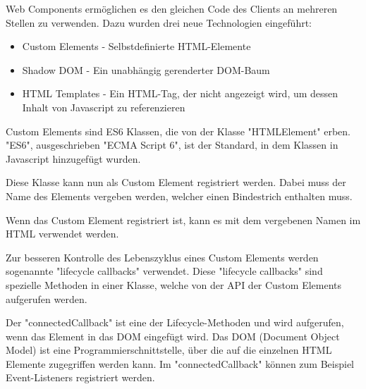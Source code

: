 
Web Components ermöglichen es den gleichen Code des Clients an mehreren Stellen zu verwenden. Dazu wurden drei neue Technologien \cite{MDNWebComponents} eingeführt:

\begin{itemize}
    \item Custom Elements - Selbstdefinierte HTML-Elemente
    \item Shadow DOM - Ein unabhängig gerenderter DOM-Baum
    \item HTML Templates - Ein HTML-Tag, der nicht angezeigt wird, um dessen Inhalt von Javascript zu referenzieren
\end{itemize}




Custom Elements sind ES6 Klassen, die von der Klasse "HTMLElement" erben. "ES6", ausgeschrieben "ECMA Script 6", ist der Standard, in dem Klassen in Javascript hinzugefügt wurden.\cite{MDNes6Classes}


Diese Klasse kann nun als Custom Element registriert werden. Dabei muss der Name des Elements vergeben werden, welcher einen Bindestrich enthalten muss.


Wenn das Custom Element registriert ist, kann es mit dem vergebenen Namen im HTML verwendet werden.


Zur besseren Kontrolle des Lebenszyklus eines Custom Elements werden sogenannte "lifecycle callbacks" verwendet.
Diese "lifecycle callbacks" sind spezielle Methoden in einer Klasse, welche von der API der Custom Elements aufgerufen werden. \cite{MDNWebCustomElements}


Der "{\ttfamily connectedCallback}" ist eine der Lifecycle-Methoden und wird aufgerufen, wenn das Element in das DOM eingefügt wird. 
Das DOM (Document Object Model) ist eine Programmierschnittstelle, über die auf die einzelnen HTML Elemente zugegriffen werden kann. \cite{MDNDOM} Im "{\ttfamily connectedCallback}" können zum Beispiel Event-Listeners registriert werden. \cite{MDNWebCustomElements}

